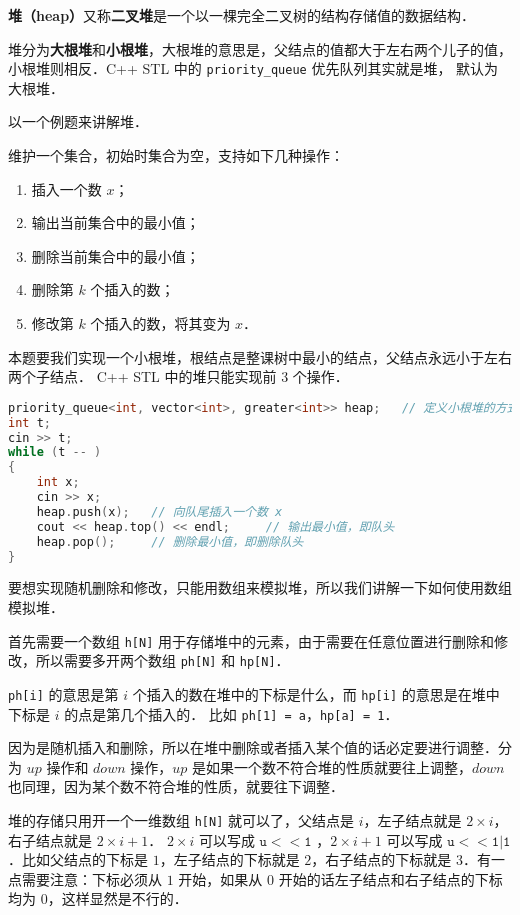 
\textbf{堆（heap）}又称\textbf{二叉堆}是一个以一棵完全二叉树的结构存储值的数据结构．

堆分为\textbf{大根堆}和\textbf{小根堆}，大根堆的意思是，父结点的值都大于左右两个儿子的值，小根堆则相反．C++ STL 中的 \verb|priority_queue| 优先队列其实就是堆， 默认为大根堆．

以一个例题来讲解堆．

维护一个集合，初始时集合为空，支持如下几种操作：
\begin{enumerate}
\item 插入一个数 $x$；
\item 输出当前集合中的最小值；
\item 删除当前集合中的最小值；
\item 删除第 $k$ 个插入的数；
\item 修改第 $k$ 个插入的数，将其变为 $x$．
\end{enumerate}

本题要我们实现一个小根堆，根结点是整课树中最小的结点，父结点永远小于左右两个子结点．
C++ STL 中的堆只能实现前 $3$ 个操作．
\begin{lstlisting}[language=cpp]
priority_queue<int, vector<int>, greater<int>> heap;   // 定义小根堆的方式
int t;
cin >> t;
while (t -- )
{
    int x;            
    cin >> x;
    heap.push(x);   // 向队尾插入一个数 x
    cout << heap.top() << endl;     // 输出最小值，即队头
    heap.pop();     // 删除最小值，即删除队头
}
\end{lstlisting}

要想实现随机删除和修改，只能用数组来模拟堆，所以我们讲解一下如何使用数组模拟堆．

首先需要一个数组 \verb|h[N]| 用于存储堆中的元素，由于需要在任意位置进行删除和修改，所以需要多开两个数组 \verb|ph[N]| 和 \verb|hp[N]|．

\verb|ph[i]| 的意思是第 $i$ 个插入的数在堆中的下标是什么，而 \verb|hp[i]| 的意思是在堆中下标是 $i$ 的点是第几个插入的．
比如 \verb|ph[1] = a|，\verb|hp[a] = 1|．

因为是随机插入和删除，所以在堆中删除或者插入某个值的话必定要进行调整．分为 $up$ 操作和 $down$ 操作，$up$ 是如果一个数不符合堆的性质就要往上调整，$down$ 也同理，因为某个数不符合堆的性质，就要往下调整．

堆的存储只用开一个一维数组 \verb|h[N]| 就可以了，父结点是 $i$，左子结点就是 $2 \times i$，右子结点就是 $2 \times i + 1$．
$2 \times i$ 可以写成 $\mathtt{u << 1}$ ，$2 \times i + 1$ 可以写成 $\mathtt{u << 1 | 1}$．比如父结点的下标是 $1$，左子结点的下标就是 $2$，右子结点的下标就是 $3$．有一点需要注意：下标必须从 $1$ 开始，如果从 $0$ 开始的话左子结点和右子结点的下标均为 $0$，这样显然是不行的．

